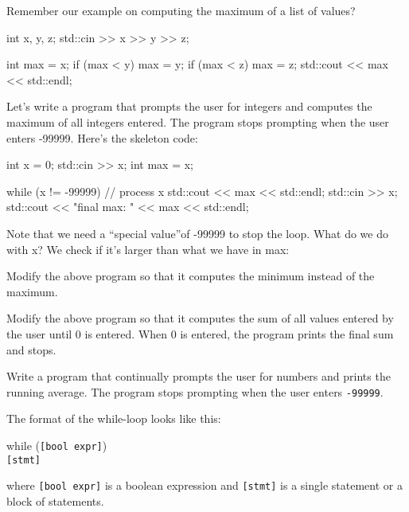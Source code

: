 Remember our example on computing the maximum of a list of values?
\begin{console}
int x, y, z;
std::cin >> x >> y >> z;

int max = x;
if (max < y) max = y;
if (max < z) max = z;
std::cout << max << std::endl;
\end{console}

Let's write a program that prompts the user for integers
and computes the maximum of all integers entered. The program stops
prompting when the user enters -99999. Here's the
skeleton code:
\begin{console}[commandchars=\~\@\$]
int x = 0;
std::cin >> x;
int max = x;

while (x != -99999)
{     
      // process x
      std::cout << max << std::endl;
      std::cin >> x;
}
std::cout << "final max: " << max
          << std::endl;
\end{console}

Note that we need a ``special value''of -99999 to stop the loop. What
do we do with x? We check if it's larger than what we
have in max:

\begin{ex}
Modify the above program so that it computes the
minimum instead of the maximum.
\end{ex}

\begin{ex} Modify the above program so that it computes the sum
of all values entered by the user until 0 is entered. When 0 is entered,
the program prints the final sum and stops.
\end{ex}
\begin{ex}
Write a program that continually prompts the user
for numbers and prints the running average. The program stops prompting
when the user enters \texttt{-99999}.
\end{ex}
\newpage{}

The format of the while-loop looks like this:
\begin{center}
while (\texttt{[bool expr]})\\
\texttt{[stmt]}
\end{center}
where \texttt{[bool expr]} is a boolean expression and \texttt{[stmt]} is a single statement or a block of statements.


